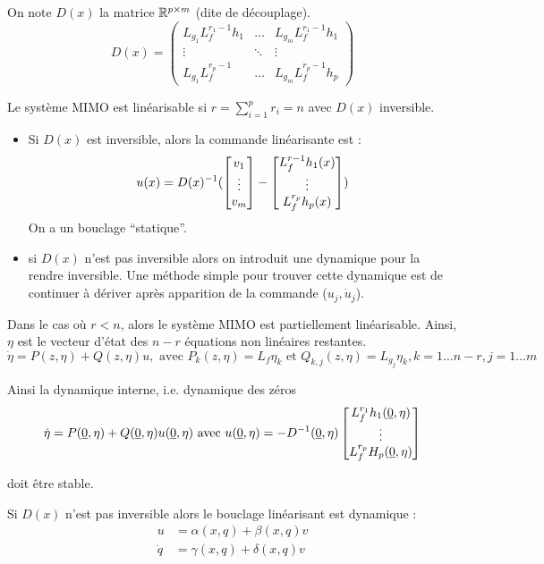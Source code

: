 \documentclass[main.tex]{subfiles}
\begin{document}
On note $D(x)$ la matrice $\mathbb{R}^{p\times m}$ (dite de découplage). 
\[
D(x) =
\begin{pmatrix}
L_{g_1}L_f^{r_1-1}h_1 & \dots & L_{g_m}L_f^{r_1 - 1} h_1 \\
  \vdots                     & \ddots     & \vdots                        \\
  L_{g_1}L_f^{r_p-1}    & \dots & L_{g_m}L_f^{r_p-1} h_p
\end{pmatrix}
\]



\begin{prop}
Le système MIMO est linéarisable si $r=\sum_{i=1}^p r_i = n$ avec $D(x)$ inversible.
\end{prop}



\begin{itemize}
\item Si $D(x)$ est inversible, alors la commande linéarisante est :
\[ u(x) = D(x)^{-1}( \begin{bmatrix} v_1 \\ \vdots \\ v_m \end{bmatrix} - \begin{bmatrix} L_f^{r-1} h_1(x) \\ \vdots \\ L_f^{r_p}h_p(x) \end{bmatrix}) \]
On a un bouclage ``statique''.


\item si $D(x)$ n'est pas inversible alors on introduit une dynamique pour la rendre inversible. Une méthode simple pour trouver cette dynamique est de continuer à dériver après apparition de la commande ($u_j,\dot{u}_j$).
\end{itemize}



Dans le cas où $r<n$, alors le système MIMO est partiellement linéarisable. Ainsi, $\eta$ est le vecteur d'état des $n-r$ équations non linéaires restantes.
\[ \dot{\eta} = P(z,\eta) + Q(z,\eta) u, \text{ avec } P_k(z,\eta) = L_f \eta_k \text{ et } Q_{k,j}(z,\eta) = L_{g_j}\eta_k, k = 1 \dots n-r, j = 1 \dots m \]

Ainsi la dynamique interne, i.e. dynamique des zéros
\[ \dot{\eta} = P(\underline{0},\eta)+Q(\underline{0},\eta)u(\underline{0},\eta) \text{ avec } u(\underline{0},\eta) = -D^{-1}(\underline{0},\eta)\begin{bmatrix} L_f^{r_1}h_1(\underline{0},\eta) \\ \vdots \\ L_f^{r_p}H_p(\underline{0},\eta) \end{bmatrix} \]

doit être stable.

Si $D(x)$ n'est pas inversible alors le bouclage linéarisant est dynamique :
\begin{align*}
u & = \alpha(x,q) + \beta(x,q) v \\
\dot{q} & = \gamma(x,q) + \delta(x,q) v
\end{align*}
\end{document}
